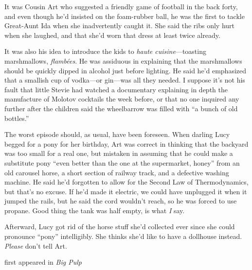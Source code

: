 
It was Cousin Art who suggested a friendly game of football in the back
forty, and even though he'd insisted on the foam-rubber ball, he was the
first to tackle Great-Aunt Ida when she inadvertently caught it. She
said the ribs only hurt when she laughed, and that she'd worn that dress
at least twice already.

It was also his idea to introduce the kids to \emph{haute
cuisine}---toasting marshmallows, \emph{flambées}. He was assiduous in
explaining that the marshmallows should be quickly dipped in alcohol
just before lighting. He said he'd emphasized that a smallish cup of
vodka---or gin---was all they needed. I suppose it's not his fault that
little Stevie had watched a documentary explaining in depth the
manufacture of Molotov cocktails the week before, or that no one
inquired any further after the children said the wheelbarrow was filled
with ``a bunch of old bottles.''

The worst episode should, as usual, have been foreseen. When darling
Lucy begged for a pony for her birthday, Art was correct in thinking
that the backyard was too small for a real one, but mistaken in assuming
that he could make a substitute pony ``even better than the one at the
supermarket, honey'' from an old carousel horse, a short section of
railway track, and a defective washing machine. He said he'd forgotten
to allow for the Second Law of Thermodynamics, but that's no excuse. If
he'd made it electric, we could have unplugged it when it jumped the
rails, but he said the cord wouldn't reach, so he was forced to use
propane. Good thing the tank was half empty, is what \emph{I} say.

Afterward, Lucy got rid of the horse stuff she'd collected ever since
she could pronounce ``pony'' intelligibly. She thinks she'd like to have
a dollhouse instead. \emph{Please} don't tell Art.

first appeared in \emph{Big Pulp}
